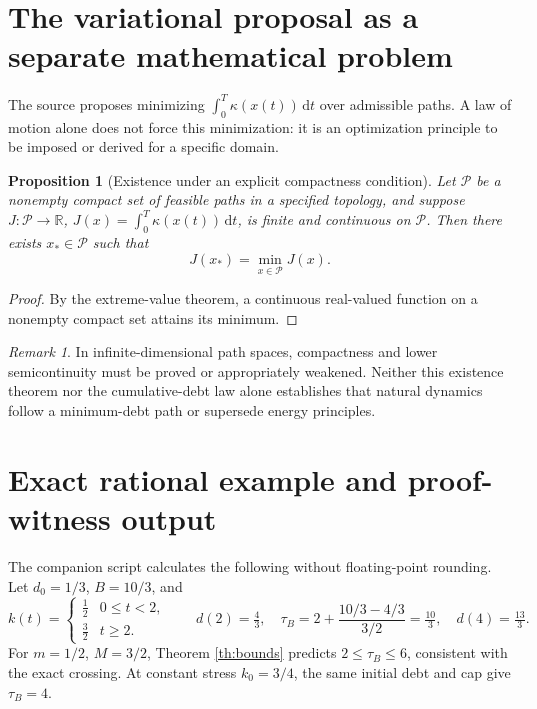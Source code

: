 \documentclass[11pt,letterpaper]{article}
\newtheorem{proposition}[theorem]{Proposition}
\theoremstyle{definition}\newtheorem{definition}[theorem]{Definition}\newtheorem{example}[theorem]{Example}
\theoremstyle{remark}\newtheorem{remark}[theorem]{Remark}
\newcommand{\R}{\mathbb R}\newcommand{\dd}{\mathrm d}\newcommand{\ess}{\operatorname{ess}}
\begin{document}
\section{The variational proposal as a separate mathematical problem}
The source proposes minimizing $\int_0^T\kappa(x(t))\,\dd t$ over admissible paths. A law of motion alone does not force this minimization: it is an optimization principle to be imposed or derived for a specific domain.
\begin{proposition}[Existence under an explicit compactness condition]\label{prop:var}
Let $\mathcal P$ be a nonempty compact set of feasible paths in a specified topology, and suppose $J:\mathcal P\to\R$, $J(x)=\int_0^T\kappa(x(t))\,\dd t$, is finite and continuous on $\mathcal P$. Then there exists $x_*\in\mathcal P$ such that
\begin{equation}\label{eq:var}
 J(x_*)=\min_{x\in\mathcal P}J(x).
\end{equation}
\end{proposition}
\begin{proof}
By the extreme-value theorem, a continuous real-valued function on a nonempty compact set attains its minimum.
\end{proof}
\begin{remark}
In infinite-dimensional path spaces, compactness and lower semicontinuity must be proved or appropriately weakened. Neither this existence theorem nor the cumulative-debt law alone establishes that natural dynamics follow a minimum-debt path or supersede energy principles.
\end{remark}

\section{Exact rational example and proof-witness output}
The companion script calculates the following without floating-point rounding. Let $d_0=1/3$, $B=10/3$, and
\begin{equation}\label{eq:piecewise}
 k(t)=\begin{cases}\tfrac12&0\leq t<2,\\[2pt]\tfrac32&t\geq2.\end{cases}
\qquad
 d(2)=\tfrac43,\quad\tau_B=2+\frac{10/3-4/3}{3/2}=\boxed{\tfrac{10}{3}},\quad d(4)=\tfrac{13}{3}.
\end{equation}
For $m=1/2$, $M=3/2$, Theorem \ref{th:bounds} predicts $2\leq\tau_B\leq6$, consistent with the exact crossing. At constant stress $k_0=3/4$, the same initial debt and cap give $\tau_B=4$.
\end{document}
